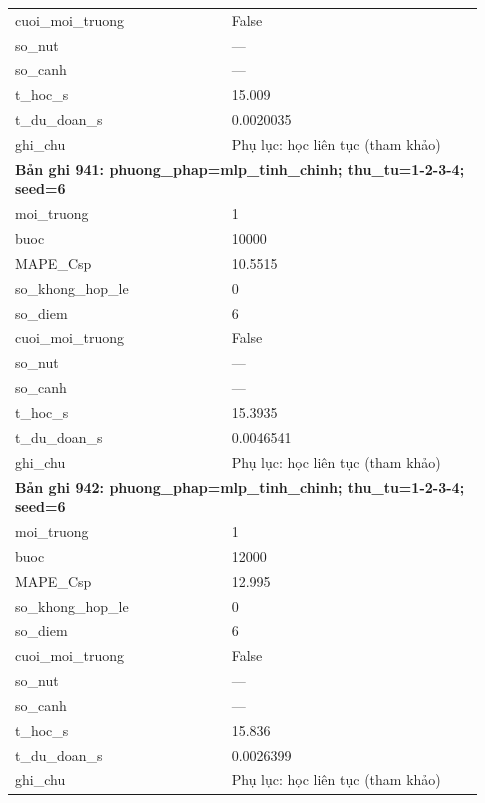 \begin{longtable}{p{0.43\linewidth}p{0.50\linewidth}}
cuoi\_\allowbreak moi\_\allowbreak truong & False \\
so\_\allowbreak nut & — \\
so\_\allowbreak canh & — \\
t\_\allowbreak hoc\_\allowbreak s & 15.009 \\
t\_\allowbreak du\_\allowbreak doan\_\allowbreak s & 0.0020035 \\
ghi\_\allowbreak chu & Phụ lục: học liên tục (tham khảo) \\
\midrule
\multicolumn{2}{p{0.95\linewidth}}{\textbf{Bản ghi 941: phuong\_phap=mlp\_tinh\_chinh; thu\_tu=1-2-3-4; seed=6}} \\
moi\_\allowbreak truong & 1 \\
buoc & 10000 \\
MAPE\_\allowbreak Csp & 10.5515 \\
so\_\allowbreak khong\_\allowbreak hop\_\allowbreak le & 0 \\
so\_\allowbreak diem & 6 \\
cuoi\_\allowbreak moi\_\allowbreak truong & False \\
so\_\allowbreak nut & — \\
so\_\allowbreak canh & — \\
t\_\allowbreak hoc\_\allowbreak s & 15.3935 \\
t\_\allowbreak du\_\allowbreak doan\_\allowbreak s & 0.0046541 \\
ghi\_\allowbreak chu & Phụ lục: học liên tục (tham khảo) \\
\midrule
\multicolumn{2}{p{0.95\linewidth}}{\textbf{Bản ghi 942: phuong\_phap=mlp\_tinh\_chinh; thu\_tu=1-2-3-4; seed=6}} \\
moi\_\allowbreak truong & 1 \\
buoc & 12000 \\
MAPE\_\allowbreak Csp & 12.995 \\
so\_\allowbreak khong\_\allowbreak hop\_\allowbreak le & 0 \\
so\_\allowbreak diem & 6 \\
cuoi\_\allowbreak moi\_\allowbreak truong & False \\
so\_\allowbreak nut & — \\
so\_\allowbreak canh & — \\
t\_\allowbreak hoc\_\allowbreak s & 15.836 \\
t\_\allowbreak du\_\allowbreak doan\_\allowbreak s & 0.0026399 \\
ghi\_\allowbreak chu & Phụ lục: học liên tục (tham khảo) \\

\end{longtable}
